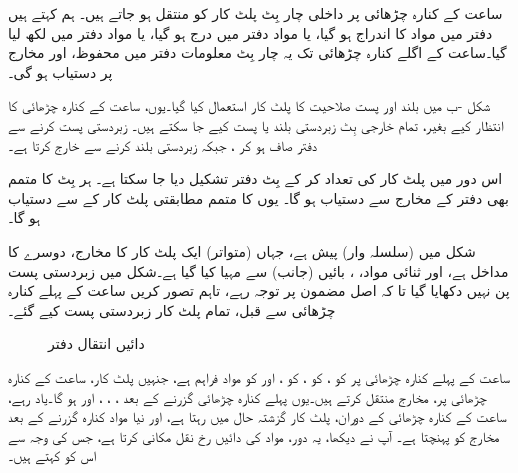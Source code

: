 ساعت کے کنارہ چڑھائی پر  داخلی  چار بِٹ پلٹ کار  کو منتقل ہو جاتے ہیں۔ ہم کہتے ہیں دفتر میں    مواد   کا  اندراج ہو  گیا،  یا مواد دفتر میں درج ہو گیا،  یا  مواد  دفتر میں لکھ لیا  گیا۔ساعت کے اگلے کنارہ چڑھائی تک یہ چار بِٹ  معلومات دفتر میں محفوظ،  اور  مخارج پر دستیاب ہو گی۔

شکل -ب  میں    بلند اور پست  صلاحیت  کا  پلٹ کار استعمال کیا گیا۔یوں، ساعت کے کنارہ چڑھائی کا  انتظار کیے بغیر،  تمام خارجی بِٹ  زبردستی  بلند یا پست کیے جا سکتے ہیں۔  زبردستی  پست کرنے سے  دفتر   صاف ہو کر ، جبکہ زبردستی بلند کرنے سے  خارج کرتا ہے۔ 

اس دور میں  پلٹ کار  کی تعداد   کر کے   بِٹ دفتر  تشکیل دیا جا سکتا ہے۔ ہر بِٹ کا متمم بھی دفتر کے مخارج سے دستیاب ہو گا۔ یوں   کا متمم  مطابقتی پلٹ کار کے  سے   دستیاب ہو گا۔ 


شکل    میں (سلسلہ وار)       پیش ہے، جہاں (متواتر)    ایک پلٹ کار کا مخارج،  دوسرے کا  مداخل  ہے، اور  ثنائی مواد، ،  بائیں (جانب)  سے مہیا کیا  گیا ہے۔شکل میں زبردستی پست پن نہیں دکھایا  گیا   تا کہ اصل مضمون پر توجہ رہے،  تاہم تصور کریں  ساعت کے پہلے کنارہ چڑھائی سے قبل،   تمام پلٹ کار زبردستی  پست کیے  گئے۔
\begin{figure}
\centering
{}
\caption{دائیں انتقال  دفتر}
\label{شکل_دفتر_دائیں_منتقل}
\end{figure}


ساعت کے پہلے کنارہ چڑھائی پر   کو ،  کو ،   کو ، اور   کو  مواد     فراہم  ہے، جنہیں    پلٹ کار، ساعت کے کنارہ چڑھائی پر،   مخارج منتقل کرتے ہیں۔یوں پہلے کنارہ چڑھائی  گزرنے  کے بعد ،    ،  ،   اور  ہو گا۔یاد رہے، ساعت کے  کنارہ چڑھائی  کے دوران، پلٹ کار گزشتہ حال میں رہتا ہے، اور نیا  مواد کنارہ گزرنے کے بعد  مخارج  کو  پہنچتا ہے۔  آپ نے دیکھا، یہ دور،  مواد کی دائیں رخ  نقل مکانی کرتا ہے، جس کی وجہ سے اس  کو  کہتے ہیں۔ 

